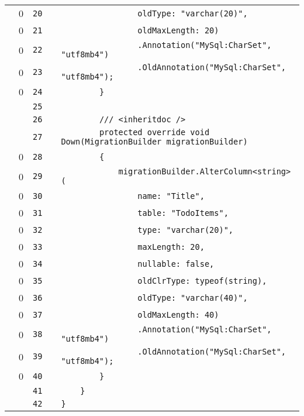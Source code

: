 \documentclass[a4paper,landscape,10pt]{article}
\begin{document}
\begin{longtable}[l]{lrrll}
\cellcolor{red} & 0 & \verb~20~ & & \verb~                oldType: "varchar(20)",~\\
\cellcolor{red} & 0 & \verb~21~ & & \verb~                oldMaxLength: 20)~\\
\cellcolor{red} & 0 & \verb~22~ & & \verb~                .Annotation("MySql:CharSet", "utf8mb4")~\\
\cellcolor{red} & 0 & \verb~23~ & & \verb~                .OldAnnotation("MySql:CharSet", "utf8mb4");~\\
\cellcolor{red} & 0 & \verb~24~ & & \verb~        }~\\
\cellcolor{gray} &  & \verb~25~ & & \verb~~\\
\cellcolor{gray} &  & \verb~26~ & & \verb~        /// <inheritdoc />~\\
\cellcolor{gray} &  & \verb~27~ & & \verb~        protected override void Down(MigrationBuilder migrationBuilder)~\\
\cellcolor{red} & 0 & \verb~28~ & & \verb~        {~\\
\cellcolor{red} & 0 & \verb~29~ & & \verb~            migrationBuilder.AlterColumn<string>(~\\
\cellcolor{red} & 0 & \verb~30~ & & \verb~                name: "Title",~\\
\cellcolor{red} & 0 & \verb~31~ & & \verb~                table: "TodoItems",~\\
\cellcolor{red} & 0 & \verb~32~ & & \verb~                type: "varchar(20)",~\\
\cellcolor{red} & 0 & \verb~33~ & & \verb~                maxLength: 20,~\\
\cellcolor{red} & 0 & \verb~34~ & & \verb~                nullable: false,~\\
\cellcolor{red} & 0 & \verb~35~ & & \verb~                oldClrType: typeof(string),~\\
\cellcolor{red} & 0 & \verb~36~ & & \verb~                oldType: "varchar(40)",~\\
\cellcolor{red} & 0 & \verb~37~ & & \verb~                oldMaxLength: 40)~\\
\cellcolor{red} & 0 & \verb~38~ & & \verb~                .Annotation("MySql:CharSet", "utf8mb4")~\\
\cellcolor{red} & 0 & \verb~39~ & & \verb~                .OldAnnotation("MySql:CharSet", "utf8mb4");~\\
\cellcolor{red} & 0 & \verb~40~ & & \verb~        }~\\
\cellcolor{gray} &  & \verb~41~ & & \verb~    }~\\
\cellcolor{gray} &  & \verb~42~ & & \verb~}~\\
\end{longtable}
\end{document}
